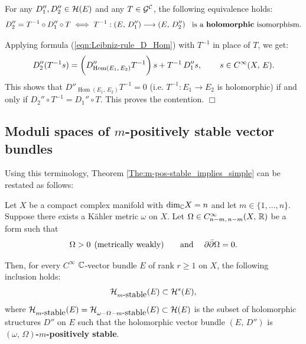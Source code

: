\documentclass[12pt]{article}
\begin{document}
\begin{Prop}\label{Prop:hol-isom_equiv-action} For any $D_1'', D_2''\in{\cal H}(E)$ and any $T\in{\cal G}^{\cal C}$, the following equivalence holds: \begin{eqnarray*}D_2'' = T^{-1}\circ D_1''\circ T \iff T^{-1}:(E,\,D_1'')\longrightarrow(E,\,D_2'') \hspace{2ex} \mbox{is a {\bf holomorphic} isomorphism}.\end{eqnarray*}


\end{Prop}

 Applying formula (\ref{eqn:Leibniz-rule_D_Hom}) with $T^{-1}$ in place of $T$, we get: \begin{eqnarray*}D''_2 (T^{-1}s) = \bigg(D''_{\operatorname{Hom} (E_1,\,E_2)}T^{-1}\bigg)\,s + T^{-1}\,D''_1 s, \hspace{5ex} s\in C^\infty(X,\,E).\end{eqnarray*} This shows that $D''_{\operatorname{Hom} (E_1,\,E_2)}T^{-1} = 0$ (i.e. $T^{-1}:E_1\longrightarrow E_2$ is holomorphic) if and only if $D_2''\circ T^{-1} = D_1''\circ T$. This proves the contention.  \hfill $\Box$

\subsection{Moduli spaces of $m$-positively stable vector bundles}\label{subsection:moduli_m-pos-stable}

  Using this terminology, Theorem \ref{The:m-pos-stable_implies_simple} can be restated as follows:

  \begin{Cor}\label{Cor:m-pos-stable_implies_simple} Let $X$ be a compact complex manifold with $\mbox{dim}_{\mathbb{C}} X =n$ and let $m\in\{1,\dots , n\}$. Suppose there exists a K\"ahler metric $\omega$ on $X$. Let $\Omega\in C^\infty_{n-m,\,n-m}(X,\,\mathbb{R})$ be a form such that \begin{eqnarray*}\Omega>0 \hspace{1ex} \mbox{(metrically weakly) \hspace{3ex} and} \hspace{3ex} \partial\bar\partial\Omega = 0.\end{eqnarray*}

    Then, for every $C^\infty$ $\mathbb{C}$-vector bundle $E$ of rank $r\geq 1$ on $X$, the following inclusion holds:  \begin{eqnarray*}{\cal H}_{m\mbox{-stable}}(E)\subset{\cal H}^s(E),\end{eqnarray*} where ${\cal H}_{m\mbox{-stable}}(E) = {\cal H}_{\omega-\Omega-m\mbox{-stable}}(E)\subset{\cal H}(E)$ is the subset of holomorphic structures $D''$ on $E$ such that the holomorphic vector bundle $(E,\,D'')$ is {\bf $(\omega,\,\Omega)$-$m$-positively stable}.


\end{Cor}  
  
\end{document}

